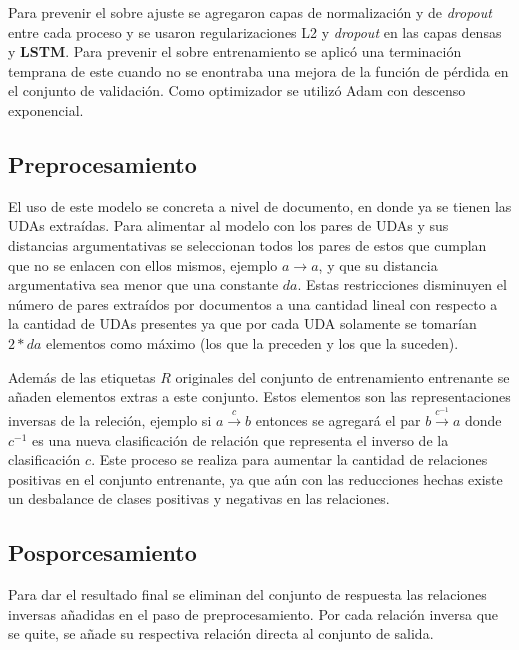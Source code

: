Para prevenir el sobre ajuste se agregaron capas de normalización y de \emph{dropout} entre cada proceso y se usaron regularizaciones
L2 y \emph{dropout} en las capas densas y \textbf{LSTM}. Para prevenir el sobre entrenamiento se aplicó una 
terminación temprana de este cuando no se enontraba una mejora de la función de pérdida en el conjunto de validación.
Como optimizador se utilizó Adam con descenso exponencial.

\subsection{Preprocesamiento}

El uso de este modelo se concreta a nivel de documento, en donde ya se tienen las UDAs extraídas. Para alimentar
al modelo con los pares de UDAs y sus distancias argumentativas se seleccionan todos los pares de estos que cumplan
que no se enlacen con ellos mismos, ejemplo $a \rightarrow a$, y que su distancia argumentativa sea menor que una
constante $da$. Estas restricciones disminuyen el número de pares extraídos por documentos a una cantidad lineal 
con respecto a la cantidad de UDAs presentes ya que por cada UDA solamente se tomarían $2 * da$ elementos como máximo
(los que la preceden y los que la suceden). 

Además de las etiquetas $R$ originales del conjunto de entrenamiento entrenante se añaden elementos extras a este
conjunto. Estos elementos son las representaciones inversas de la releción, ejemplo si $a \xrightarrow{c} b$ entonces 
se agregará el par $b \xrightarrow{c^{-1}} a$ donde $c^{-1}$ es una nueva clasificación de relación que representa
el inverso de la clasificación $c$. Este proceso se realiza para aumentar la cantidad de relaciones positivas en el
conjunto entrenante, ya que aún con las reducciones hechas existe un desbalance de clases positivas y negativas en
las relaciones.

\subsection{Posporcesamiento}

Para dar el resultado final se eliminan del conjunto de respuesta las relaciones inversas añadidas en el paso de 
preprocesamiento. Por cada relación inversa que se quite, se añade su respectiva relación directa al conjunto
de salida.